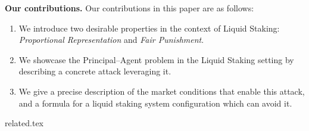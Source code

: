 \noindent
\textbf{Our contributions.} Our contributions in this paper are as follows:
\begin{enumerate}
    \item We introduce two desirable properties in the context of Liquid Staking:
          \emph{Proportional Representation} and \emph{Fair Punishment}.
    \item We showcase the Principal--Agent problem in the Liquid Staking
          setting by describing a concrete attack leveraging it.
    \item We give a precise description of the market conditions that enable
          this attack, and a formula for a liquid staking system configuration
          which can avoid it.
\end{enumerate}

{related.tex}
